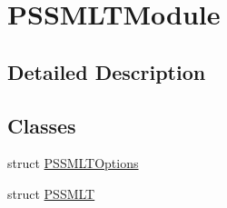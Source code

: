 \hypertarget{group___p_s_s_m_l_t_module}{}\section{P\+S\+S\+M\+L\+T\+Module}
\label{group___p_s_s_m_l_t_module}


\subsection{Detailed Description}
\subsection*{Classes}
\begin{DoxyCompactItemize}
\item 
struct \hyperlink{struct_p_s_s_m_l_t_options}{P\+S\+S\+M\+L\+T\+Options}
\item 
struct \hyperlink{struct_p_s_s_m_l_t}{P\+S\+S\+M\+LT}
\end{DoxyCompactItemize}
